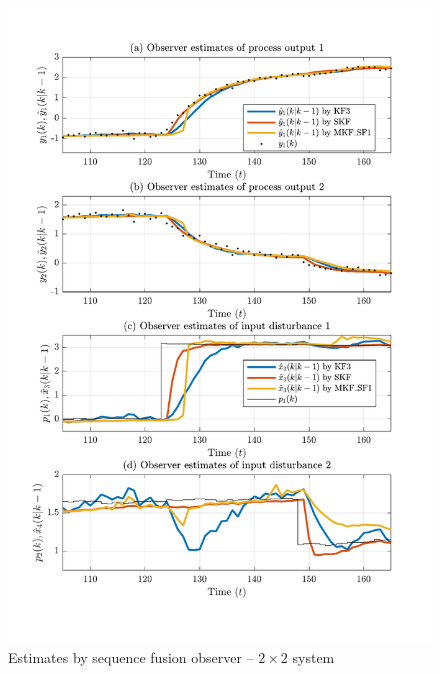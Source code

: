 \begin{figure}[htp]
	\centering
	\includegraphics[width=12cm]{images/rod_obs_sim2_all_seed_y_est2_SF1.pdf}
	\caption{Estimates by sequence fusion observer –  $2\times2$ system}
	\label{fig:rod-obs-sim2-yest-2-SP}
\end{figure}

